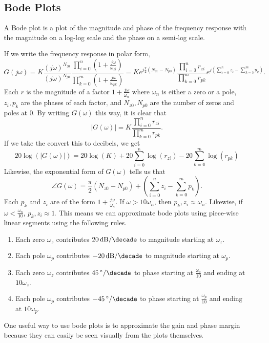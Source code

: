 \subsection{Bode Plots}
\begin{definition}
  A Bode plot is a plot of the magnitude and phase of the frequency response with the magnitude on a log-log scale and the phase on a semi-log scale.
  \label{defn:bode-plot}
\end{definition}
If we write the frequency response in polar form,
\[
  G(j\omega) = K \frac{(j\omega)^{N_{z0}}}{(j\omega)^{N_{p0}}}\frac{\prod_{i=0}^{n}{(1+\frac{j\omega}{\omega_{zi}})}}{\prod_{k=0}^{m}{(1+\frac{j\omega}{\omega_{pk}})}} = Ke^{j\frac{\pi}{2}(N_{z0}-N_{p0})} \frac{\prod_{i=0}^{n}{r_{zi}}}{\prod_{k=0}^{m}{r_{pk}}} e^{j(\sum_{i=0}^{n}{z_i} - \sum_{k=0}^{m}{p_k})}.
\]
Each $r$ is the magnitude of a factor $1 + \frac{j\omega}{\omega_n}$ where $\omega_n$ is either a zero or a pole, $z_i, p_k$ are the phases of each factor, and $N_{z0}, N_{p0}$ are the number of zeros and poles at 0.
By writing $G(\omega)$ this way, it is clear that 
\[
  |G(\omega)| = K \frac{\prod_{i=0}^{n}{r_{zi}}}{\prod_{k=0}^{m}{r_{pk}}}.
\]
If we take the convert this to decibels, we get 
\[
  20\log(|G(\omega)|) = 20\log(K) + 20\sum_{i=0}^{n}{\log(r_{zi})} - 20\sum_{k=0}^{m}{\log(r_{pk})}
\]
Likewise, the exponential form of $G(\omega)$ tells us that 
\[
  \angle G(\omega) = \frac{\pi}{2}(N_{z0}-N_{p0})+ (\sum_{i=0}^{n}{z_i} - \sum_{k=0}^{m}{p_k}).
\]
Each $p_k$ and $z_i$ are of the form $1 + \frac{j\omega}{\omega_n}$.
If $\omega > 10\omega_n$, then $p_k, z_i \approx \omega_n$. Likewise, if $\omega < \frac{\omega_n}{10}$, $p_k, z_i \approx 1$.
This means we can approximate bode plots using piece-wise linear segments using the following rules.
\begin{enumerate}
  \item Each zero $\omega_z$ contributes $\SI[per-mode=symbol]{20}{\decibel\per\decade}$ to magnitude starting at $\omega_z$.
  \item Each pole $\omega_p$ contributes $\SI[per-mode=symbol]{-20}{\decibel\per\decade}$ to magnitude starting at $\omega_p$.
  \item Each zero $\omega_z$ contributes $\SI[per-mode=symbol]{45}{\degree\per\decade}$ to phase starting at $\frac{\omega_z}{10}$ and ending at $10\omega_z$.
  \item Each pole $\omega_p$ contributes $\SI[per-mode=symbol]{-45}{\degree\per\decade}$ to phase starting at $\frac{\omega_p}{10}$ and ending at $10\omega_p$.
\end{enumerate}
One useful way to use bode plots is to approximate the gain and phase margin because they can easily be seen visually from the plots themselves.
